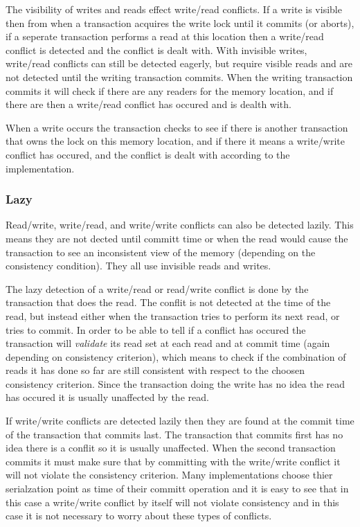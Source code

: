 The visibility of writes and reads effect write/read conflicts.
If a write is visible then from when a transaction acquires the write lock until it commits (or aborts), if a seperate transaction performs a read at this location then a write/read conflict is detected and the conflict is dealt with.
With invisible writes, write/read conflicts can still be detected eagerly, but require visible reads and are not detected until the writing transaction commits.
When the writing transaction commits it will check if there are any readers for the memory location, and if there are then a write/read conflict has occured and is dealth with.

When a write occurs the transaction checks to see if there is another transaction that owns the lock on this memory location, and if there it means a write/write conflict has occured, and the conflict is dealt with according to the implementation.

\subsubsection{Lazy}
Read/write, write/read, and write/write conflicts can also be detected lazily.
This means they are not dected until committ time or when the read would cause the transaction to see an inconsistent view of the memory (depending on the consistency condition).
They all use invisible reads and writes.

The lazy detection of a write/read or read/write conflict is done by the transaction that does the read.
The conflit is not detected at the time of the read, but instead either when the transaction tries to perform its next read, or tries to commit.
In order to be able to tell if a conflict has occured the transaction will \emph{validate} its read set at each read and at commit time (again depending on consistency criterion), which means to check if the combination of reads it has done so far are still consistent with respect to the choosen consistency criterion.
Since the transaction doing the write has no idea the read has occured it is usually unaffected by the read.

If write/write conflicts are detected lazily then they are found at the commit time of the transaction that commits last.
The transaction that commits first has no idea there is a conflit so it is usually unaffected.
When the second transaction commits it must make sure that by committing with the write/write conflict it will not violate the consistency criterion.
Many implementations choose thier serialzation point as time of their committ operation and it is easy to see that in this case a write/write conflict by itself will not violate consistency and in this case it is not necessary to worry about these types of conflicts.

